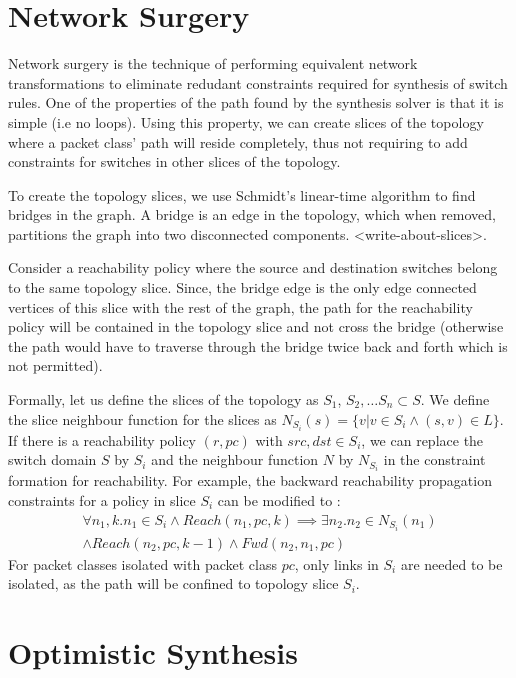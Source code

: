 \section{Network Surgery}
Network surgery is the technique of performing equivalent network transformations to eliminate redudant constraints required for synthesis of switch rules. One of the properties of the path found by the synthesis solver is that it is simple (i.e no loops). Using this property, we can create slices of the topology where a packet class' path will reside completely, thus not requiring to add constraints for switches in other slices of the topology. 

To create the topology slices, we use Schmidt's linear-time algorithm\cite{schmidt} to find bridges in the graph. A bridge is an edge in the topology, which when removed, partitions the graph into two disconnected components. <write-about-slices>. 

Consider a reachability policy where the source and destination switches belong to the same topology slice. Since, the bridge edge is the only edge connected vertices of this slice with the rest of the graph, the path for the reachability policy will be contained in the topology slice and not cross the bridge (otherwise the path would have to traverse through the bridge twice back and forth which is not permitted). 

Formally, let us define the slices of the topology as $S_1$, $S_2, \ldots S_n \subset S$. We define the slice neighbour function for the slices as $N_{S_i}(s) = \{v | v \in S_i \wedge (s,v) \in L\}$. If there is a reachability policy $(r, pc)$ with $src,dst \in S_i$, we can replace the switch domain $S$ by $S_i$ and the neighbour function $N$ by $N_{S_i}$ in the constraint formation for reachability. For example, the backward reachability propagation constraints for a policy in slice $S_i$ can be modified to : 
\begin{multline}
\forall n_1,k.  n_1 \in S_i \wedge Reach(n_1,pc,k) \implies \exists n_2. n_2 \in N_{S_i}(n_1) \\ \wedge  Reach(n_2,pc,k-1) \wedge Fwd(n_2,n_1,pc)
\end{multline}
For packet classes isolated with packet class $pc$, only links in $S_i$ are needed to be isolated, as the path will be confined to topology slice $S_i$. 

\section{Optimistic Synthesis} \label{sec:optimistic}

